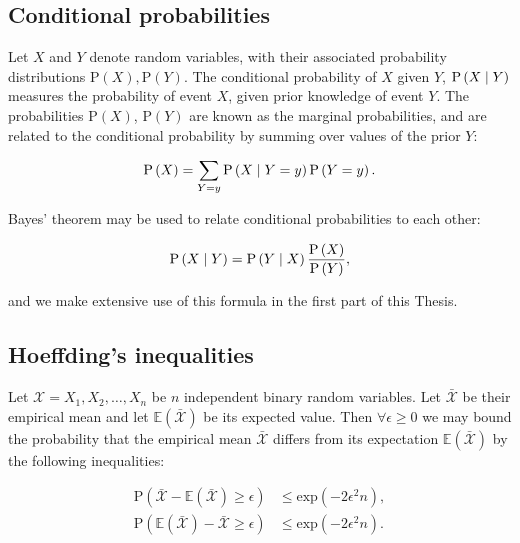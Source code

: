 \FloatBarrier
\subsection{Conditional probabilities}
Let $X$ and $Y$ denote random variables, with their associated probability distributions $\text{P}\left(X\right), \text{P}\left(Y\right)$. The conditional probability of $X$ given $Y$, $\text{P}\left(X \; \middle| \; Y\right)$ measures the probability of event $X$, given prior knowledge of event $Y$. The probabilities $\text{P}\left(X\right)$, $\text{P}\left(Y\right)$ are known as the marginal probabilities, and are related to the conditional probability by summing over values of the prior $Y$:

\begin{equation}
\text{P}\left(X\right) = \sum_{Y=y} \text{P}\left(X \; \middle| \; Y=y\right) \text{P}\left(Y=y\right).
\end{equation}

\noindent Bayes' theorem may be used to relate conditional probabilities to each other:

\begin{equation}\label{eqn:intro_bayes}
\text{P}\left(X \; \middle| \; Y\right) = \text{P}\left(Y \; \middle| \; X\right) \frac{\text{P}\left(X\right)}{\text{P}\left(Y\right)},
\end{equation}

\noindent and we make extensive use of this formula in the first part of this Thesis.

\FloatBarrier
\subsection{Hoeffding's inequalities}
Let $\mathcal{X} = X_1, X_2, \dots, X_n$ be $n$ independent binary random variables. Let $\bar{\mathcal{X}}$ be their empirical mean and let $\mathbb{E}\left(\bar{\mathcal{X}}\right)$ be its expected value. Then $\forall \epsilon \ge 0$ we may bound the probability that the empirical mean $\bar{\mathcal{X}}$ differs from its expectation $\mathbb{E}\left(\bar{\mathcal{X}}\right)$ by the following inequalities:

\begin{align}
\label{eqn:hoeffding1}
\text{P}\left(\bar{\mathcal{X}} - \mathbb{E}\left(\bar{\mathcal{X}}\right) \ge \epsilon\right) &\le \text{exp}\left(- 2 \epsilon^2 n\right), \\
\label{eqn:hoeffding2}
\text{P}\left(\mathbb{E}\left(\bar{\mathcal{X}}\right) - \bar{\mathcal{X}} \ge \epsilon\right) &\le \text{exp}\left(- 2 \epsilon^2 n\right).
\end{align}



